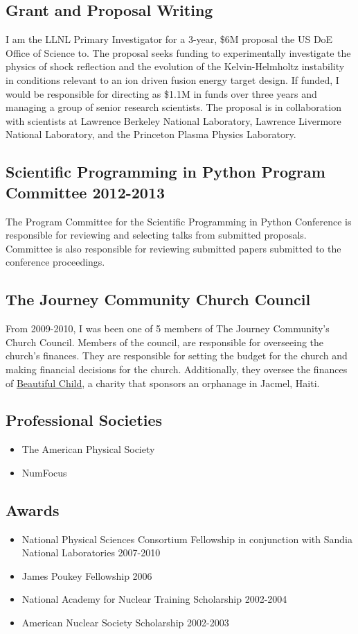 \documentclass[letterpaper,10pt]{article}
\begin{document}
\subsection*{Grant and Proposal Writing}
I am the LLNL Primary Investigator for a 3-year, \$6M proposal the US DoE
Office of Science to.  The proposal seeks funding to  experimentally investigate
the physics of shock reflection and the evolution of the Kelvin-Helmholtz
instability in conditions relevant to an ion driven fusion energy target
design.  If funded, I would be responsible for directing as \$1.1M in funds
over three years and managing a group of senior research scientists.  The
proposal is in collaboration with scientists at Lawrence Berkeley National
Laboratory, Lawrence Livermore National Laboratory, and the Princeton Plasma
Physics Laboratory.


\subsection*{Scientific Programming in Python Program Committee 2012-2013}
The Program Committee for the Scientific Programming in Python Conference is
responsible for reviewing and selecting talks from submitted proposals.
Committee is also responsible for reviewing submitted papers submitted to the
conference proceedings.


\subsection*{The Journey Community Church Council}
From 2009-2010, I was been one of 5 members of The Journey Community's Church
Council.  Members of the council, are responsible for overseeing the church's
finances.  They are responsible for setting the  budget for the church and
making financial decisions for the church.  Additionally, they oversee the
finances of \href{http://www.beautifulchild.org}{Beautiful Child}, a charity
that sponsors an orphanage in Jacmel, Haiti.


\subsection*{Professional Societies}
\begin{itemize}
	\item The American Physical Society
	\item NumFocus
\end{itemize}

\subsection*{Awards}
\begin{itemize}
	\item National Physical Sciences Consortium Fellowship in conjunction with Sandia National Laboratories 2007-2010
	\item James Poukey Fellowship 2006
	\item National Academy for Nuclear Training Scholarship 2002-2004
	\item American Nuclear Society Scholarship 2002-2003
\end{itemize}
\end{document}
